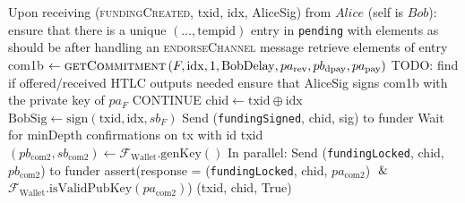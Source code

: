 \begin{algorithmic}[1]
    \State Upon receiving (\textsc{fundingCreated}, txid, idx, AliceSig) from
    $Alice$ (self is $Bob$):
      \State ensure that there is a unique $\left(\dots, \mathrm{tempid}\right)$
      entry in \texttt{pending} with elements as should be after handling an
      \textsc{endorseChannel} message
      \State retrieve elements of entry
      \State com1b $\gets \textsc{getCommitment}\left(F, \mathrm{idx}, 1,
      \mathrm{BobDelay}, pa_{\mathrm{rev}}, pb_{\mathrm{dpay}},
      pa_{\mathrm{pay}}\right)$ TODO: find if offered/received HTLC outputs
      needed
      \State ensure that AliceSig signs com1b with the private key of $pa_F$
      \State CONTINUE
      \State $\mathrm{chid} \gets \mathrm{txid} \oplus \mathrm{idx}$
      \State $\mathrm{BobSig} \gets \mathrm{sign}\left(\mathrm{txid},
      \mathrm{idx}, sb_F\right)$
      \State Send (\texttt{fundingSigned}, chid, sig) to funder
      \State Wait for minDepth confirmations on tx with id txid
      \State $\left(pb_{\mathrm{com}2}, sb_{\mathrm{com}2}\right) \gets
      \mathcal{F}_{\mathrm{Wallet}}.\mathrm{genKey}\left(\right)$
      \State In parallel:
      \Indent
        \State Send (\texttt{fundingLocked}, chid, $pb_{\mathrm{com}2}$) to
        funder
        \State assert(response = (\texttt{fundingLocked}, chid,
        $pa_{\mathrm{com}2}$) $\And$
        \Indent
          \State $\mathcal{F}_{\mathrm{Wallet}}.\mathrm{isValidPubKey}
          \left(pa_{\mathrm{com}2}\right)$)
        \EndIndent
      \EndIndent
      \State \Return (txid, chid, True)
    \State




\end{algorithmic}
